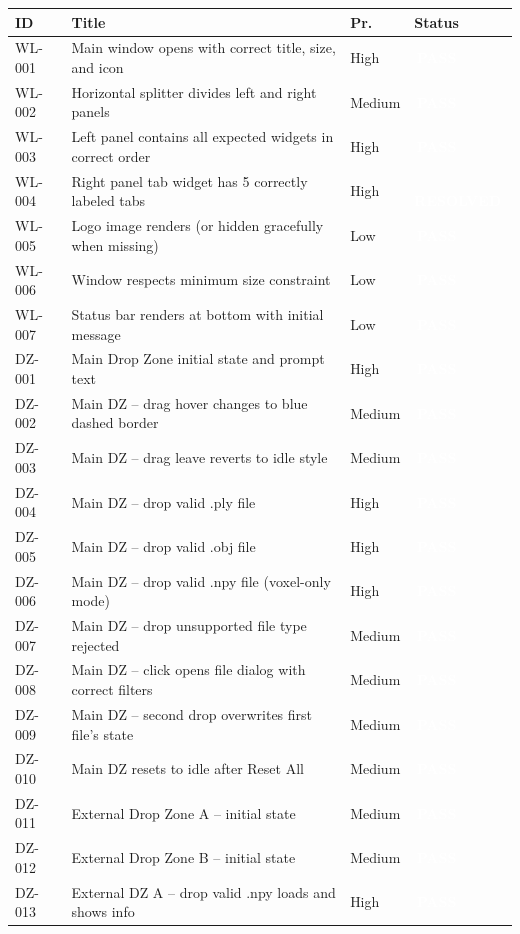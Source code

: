 \documentclass[12pt,a4paper]{article}
\newcommand{\statuspass}{\colorbox{statusgreen}{\textcolor{white}{\textbf{\,PASS\,}}}}
\newcommand{\statusresolved}{\colorbox{statusorange}{\textcolor{white}{\textbf{\,RESOLVED\,}}}}
\begin{document}
{\small
\begin{longtable}{p{1.7cm}p{7.7cm}p{1.3cm}p{2cm}}
\toprule
\textbf{ID} & \textbf{Title} & \textbf{Pr.} & \textbf{Status} \\
\midrule
WL-001 & Main window opens with correct title, size, and icon & High & \statuspass \\
WL-002 & Horizontal splitter divides left and right panels & Medium & \statuspass \\
WL-003 & Left panel contains all expected widgets in correct order & High & \statuspass \\
WL-004 & Right panel tab widget has 5 correctly labeled tabs & High & \statusresolved \\
WL-005 & Logo image renders (or hidden gracefully when missing) & Low & \statuspass \\
WL-006 & Window respects minimum size constraint & Low & \statuspass \\
WL-007 & Status bar renders at bottom with initial message & Low & \statuspass \\
DZ-001 & Main Drop Zone initial state and prompt text & High & \statuspass \\
DZ-002 & Main DZ -- drag hover changes to blue dashed border & Medium & \statuspass \\
DZ-003 & Main DZ -- drag leave reverts to idle style & Medium & \statuspass \\
DZ-004 & Main DZ -- drop valid .ply file & High & \statuspass \\
DZ-005 & Main DZ -- drop valid .obj file & High & \statuspass \\
DZ-006 & Main DZ -- drop valid .npy file (voxel-only mode) & High & \statuspass \\
DZ-007 & Main DZ -- drop unsupported file type rejected & Medium & \statuspass \\
DZ-008 & Main DZ -- click opens file dialog with correct filters & Medium & \statuspass \\
DZ-009 & Main DZ -- second drop overwrites first file's state & Medium & \statuspass \\
DZ-010 & Main DZ resets to idle after Reset All & Medium & \statuspass \\
DZ-011 & External Drop Zone A -- initial state & Medium & \statuspass \\
DZ-012 & External Drop Zone B -- initial state & Medium & \statuspass \\
DZ-013 & External DZ A -- drop valid .npy loads and shows info & High & \statuspass \\

\end{longtable}}
\end{document}
